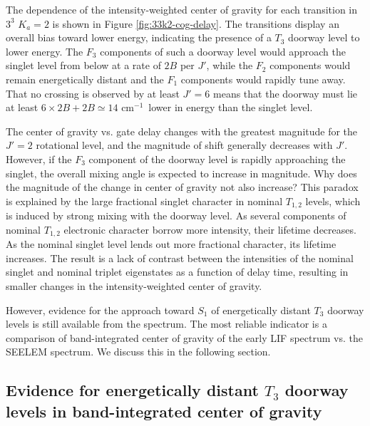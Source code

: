 \documentclass[12pt]{mitthesis}
\newcommand{\rcm}{cm$^{-1}$}
\newcommand{\Ka}[1]{$K_a\!\!=\!#1$}
\begin{document}
The dependence of the intensity-weighted center of gravity for each
transition in $3^3$ \Ka{2} is shown in Figure
\ref{fig:33k2-cog-delay}.  The transitions display an overall bias
toward lower energy, indicating the presence of a $T_3$ doorway level
to lower energy.  The $F_3$ components of such a doorway level would
approach the singlet level from below at a rate of $2B$ per $J'$,
while the $F_2$ components would remain energetically distant and the
$F_1$ components would rapidly tune away.  That no crossing is
observed by at least $J'=6$ means that the doorway must lie at least
$6\times2B + 2B \simeq 14$ \rcm\ lower in energy than the singlet
level.

The center of gravity vs. gate delay changes with the greatest
magnitude for the $J'=2$ rotational level, and the magnitude of shift
generally decreases with $J'$.  However, if the $F_3$ component of the
doorway level is rapidly approaching the singlet, the overall mixing
angle is expected to increase in magnitude.  Why does the magnitude of
the change in center of gravity not also increase?  This paradox is
explained by the large fractional singlet character in nominal
$T_{1,2}$ levels, which is induced by strong mixing with the doorway
level.  As several components of nominal $T_{1,2}$ electronic
character borrow more intensity, their lifetime decreases.  As the
nominal singlet level lends out more fractional character, its
lifetime increases.  The result is a lack of contrast between the
intensities of the nominal singlet and nominal triplet eigenstates as
a function of delay time, resulting in smaller changes in the
intensity-weighted center of gravity.

However, evidence for the approach toward $S_1$ of energetically
distant $T_3$ doorway levels is still available from the spectrum.
The most reliable indicator is a comparison of band-integrated center
of gravity of the early LIF spectrum vs. the SEELEM spectrum.  We
discuss this in the following section.

\subsection{Evidence for energetically distant $T_3$ doorway levels in
  band-integrated center of gravity}

\end{document}
